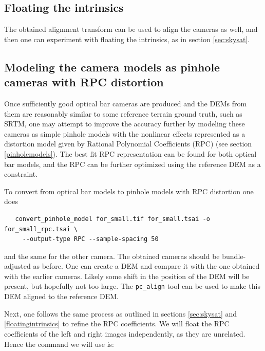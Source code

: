 \subsection{Floating the intrinsics}

The obtained alignment transform can be used to align 
the cameras as well, and then one can experiment with 
floating the intrinsics, as in section \ref{sec:skysat}.

\subsection{Modeling the camera models as pinhole cameras with RPC distortion}

Once sufficiently good optical bar cameras are produced and the DEMs
from them are reasonably similar to some reference terrain ground truth,
such as SRTM, one may attempt to improve the accuracy further by
modeling these cameras as simple pinhole models with the nonlinear
effects represented as a distortion model given by Rational
Polynomial Coefficients (RPC) (see section \ref{pinholemodels}). The
best fit RPC representation can be found for both optical bar models,
and the RPC can be further optimized using the reference DEM as
a constraint.

To convert from optical bar models to pinhole models with RPC distortion
one does

\begin{verbatim}
   convert_pinhole_model for_small.tif for_small.tsai -o for_small_rpc.tsai \
     --output-type RPC --sample-spacing 50
\end{verbatim}

and the same for the other camera. The obtained cameras should be
bundle-adjusted as before. One can create a DEM and compare
it with the one obtained with the earlier cameras. Likely 
some shift in the position of the DEM will be present, but hopefully 
not too large. The \texttt{pc\_align} tool can be used 
to make this DEM aligned to the reference DEM. 

Next, one follows the same process as outlined in sections
\ref{sec:skysat} and \ref{floatingintrinsics} to refine the RPC
coefficients. We will float the RPC coefficients of the left and
right images independently, as they are unrelated. Hence the command
we will use is:

